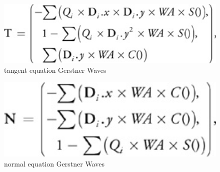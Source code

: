 \documentclass[12pt,letterpaper]{article}
\begin{document}
\begin{figure}[p]
    \centering
    \includegraphics[width=1.0\textwidth]{T.jpg}
    \caption{tangent equation Gerstner Waves}
\end{figure}
\begin{figure}[p]
    \centering
    \includegraphics[width=1.0\textwidth]{N.jpg}
    \caption{normal equation Gerstner Waves}
\end{figure}
\end{document}
